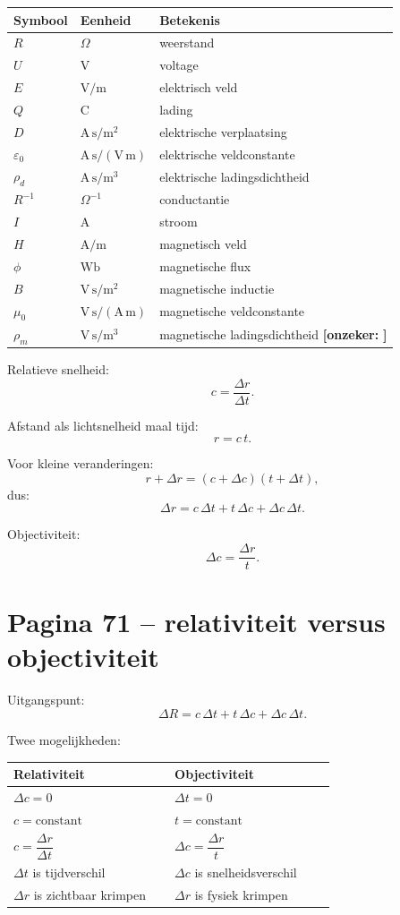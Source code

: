 \documentclass[11pt,a4paper]{article}
\newcommand{\onzeker}[1]{\ifmmode\text{\color{red!70!black}\bfseries[onzeker]}\else\textcolor{red!70!black}{\textbf{[onzeker:} #1\textbf{]}}\fi}
\begin{document}
\begin{longtable}{lll}
\toprule
\textbf{Symbool} & \textbf{Eenheid} & \textbf{Betekenis}\\
\midrule
$R$ & $\Omega$ & weerstand\\
$U$ & $\mathrm{V}$ & voltage\\
$E$ & $\mathrm{V/m}$ & elektrisch veld\\
$Q$ & $\mathrm{C}$ & lading\\
$D$ & $\mathrm{A\,s/m^{2}}$ & elektrische verplaatsing\\
$\varepsilon_0$ & $\mathrm{A\,s/(V\,m)}$ & elektrische veldconstante\\
$\rho_d$ & $\mathrm{A\,s/m^{3}}$ & elektrische ladingsdichtheid\\
$R^{-1}$ & $\Omega^{-1}$ & conductantie\\
$I$ & $\mathrm{A}$ & stroom\\
$H$ & $\mathrm{A/m}$ & magnetisch veld\\
$\phi$ & $\mathrm{Wb}$ & magnetische flux\\
$B$ & $\mathrm{V\,s/m^{2}}$ & magnetische inductie\\
$\mu_0$ & $\mathrm{V\,s/(A\,m)}$ & magnetische veldconstante\\
$\rho_m$ & $\mathrm{V\,s/m^{3}}$ & magnetische ladingsdichtheid \onzeker{}\\
\bottomrule
\end{longtable}

Relatieve snelheid:
$$
c=\frac{\Delta r}{\Delta t}.
$$

Afstand als lichtsnelheid maal tijd:
$$
r=c\,t.
$$

Voor kleine veranderingen:
$$
r+\Delta r
=
(c+\Delta c)(t+\Delta t),
$$
dus:
$$
\Delta r
=
c\,\Delta t
+
t\,\Delta c
+
\Delta c\,\Delta t.
$$

Objectiviteit:
$$
\Delta c
=
\frac{\Delta r}{t}.
$$

\section*{Pagina 71 -- relativiteit versus objectiviteit}

Uitgangspunt:
$$
\Delta R
=
c\,\Delta t
+
t\,\Delta c
+
\Delta c\,\Delta t.
$$

Twee mogelijkheden:

\begin{longtable}{p{0.45\linewidth}p{0.45\linewidth}}
\toprule
\textbf{Relativiteit} & \textbf{Objectiviteit}\\
\midrule
$\Delta c=0$ & $\Delta t=0$\\
$c=\mathrm{constant}$ & $t=\mathrm{constant}$\\
$c=\dfrac{\Delta r}{\Delta t}$ & $\Delta c=\dfrac{\Delta r}{t}$\\
$\Delta t$ is tijdverschil & $\Delta c$ is snelheidsverschil\\
$\Delta r$ is zichtbaar krimpen & $\Delta r$ is fysiek krimpen\\
\bottomrule
\end{longtable}
\end{document}
